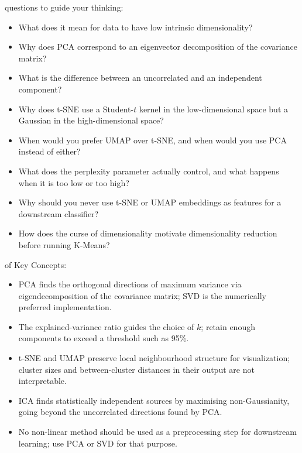  questions to guide your thinking:
\begin{itemize}
    \item What does it mean for data to have low intrinsic dimensionality?
    \item Why does PCA correspond to an eigenvector decomposition of the covariance matrix?
    \item What is the difference between an uncorrelated and an independent component?
    \item Why does t-SNE use a Student-$t$ kernel in the low-dimensional space but a Gaussian in the high-dimensional space?
    \item When would you prefer UMAP over t-SNE, and when would you use PCA instead of either?
    \item What does the perplexity parameter actually control, and what happens when it is too low or too high?
    \item Why should you never use t-SNE or UMAP embeddings as features for a downstream classifier?
    \item How does the curse of dimensionality motivate dimensionality reduction before running K-Means?
\end{itemize}

 of Key Concepts:
\begin{itemize}
    \item PCA finds the orthogonal directions of maximum variance via eigendecomposition of the covariance matrix; SVD is the numerically preferred implementation.
    \item The explained-variance ratio guides the choice of $k$; retain enough components to exceed a threshold such as 95\%.
    \item t-SNE and UMAP preserve local neighbourhood structure for visualization; cluster sizes and between-cluster distances in their output are not interpretable.
    \item ICA finds statistically independent sources by maximising non-Gaussianity, going beyond the uncorrelated directions found by PCA.
    \item No non-linear method should be used as a preprocessing step for downstream learning; use PCA or SVD for that purpose.
\end{itemize}


